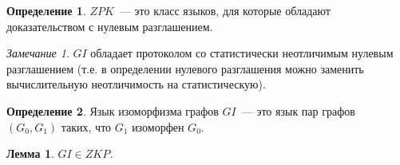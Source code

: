 \documentclass[12pt,a4paper]{article}
\theoremstyle{definition}
\newtheorem{definition}{Определение}[section]
\theoremstyle{plain}
\newtheorem{lemma}{Лемма}[section]
\theoremstyle{remark}
\newtheorem{remark}{Замечание}[section]
\begin{document}
\begin{definition}
$ZPK$~--- это класс языков, для которые обладают доказательством с нулевым разглашением.
\end{definition}

\begin{remark}
$GI$ обладает протоколом со статистически неотличимым нулевым разглашением
(т.е. в определении нулевого разглашения можно заменить вычислительную неотличимость на статистическую).
\end{remark}

\begin{definition}
Язык изоморфизма графов $GI$~--- это язык пар графов $(G_0, G_1)$ таких, что $G_1$ изоморфен $G_0$.
\end{definition}

\begin{lemma}
$GI\in ZKP$.
\end{lemma}
\end{document}
